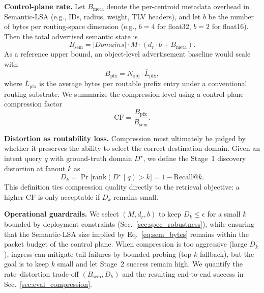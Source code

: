 \documentclass[journal]{IEEEtran}
\newcommand{\boldparagraph}[1]{\vspace{0.1cm}\noindent\textbf{#1.}}
\begin{document}
\boldparagraph{Control-plane rate}
Let $B_{\text{meta}}$ denote the per-centroid metadata overhead in Semantic-LSA (e.g., IDs, radius, weight, TLV headers),
and let $b$ be the number of bytes per routing-space dimension (e.g., $b{=}4$ for float32, $b{=}2$ for float16).
Then the total advertised semantic state is
\begin{equation}
B_{\text{sem}} = |Domains| \cdot M \cdot (d_r \cdot b + B_{\text{meta}}).
\label{eq:sem_bytes}
\end{equation}
As a reference upper bound, an object-level advertisement baseline would scale with
\begin{equation}
B_{\text{pfx}} = N_{\text{obj}} \cdot \overline{L}_{\text{pfx}},
\label{eq:pfx_bytes}
\end{equation}
where $\overline{L}_{\text{pfx}}$ is the average bytes per routable prefix entry under a conventional routing substrate.
We summarize the compression level using a control-plane compression factor
\begin{equation}
\mathrm{CF} = \frac{B_{\text{pfx}}}{B_{\text{sem}}}.
\label{eq:compression_factor}
\end{equation}

\boldparagraph{Distortion as routability loss}
Compression must ultimately be judged by whether it preserves the ability to select the correct destination domain.
Given an intent query $q$ with ground-truth domain $D^\star$, we define the Stage~1 discovery distortion at fanout $k$ as
\begin{equation}
D_k = \Pr\big[\mathrm{rank}(D^\star \mid q) > k\big] = 1 - \mathrm{Recall@}k.
\label{eq:distortion_recall}
\end{equation}
This definition ties compression quality directly to the retrieval objective: a higher $\mathrm{CF}$ is only acceptable
if $D_k$ remains small.

\boldparagraph{Operational guardrails} We select $(M, d_r, b)$ to keep $D_k \le \epsilon$ for a small $k$ bounded by deployment constraints (Sec.~\ref{sec:spec_robustness}), while ensuring that the Semantic-LSA size implied by Eq.~\ref{eq:sem_bytes} remains within the packet budget of the control plane.
When compression is too aggressive (large $D_k$), ingress can mitigate tail failures by bounded probing (top-$k$ fallback),
but the goal is to keep $k$ small and let Stage~2 success remain high.
We quantify the rate--distortion trade-off $(B_{\text{sem}}, D_k)$ and the resulting end-to-end success in Sec.~\ref{sec:eval_compression}.
\end{document}
